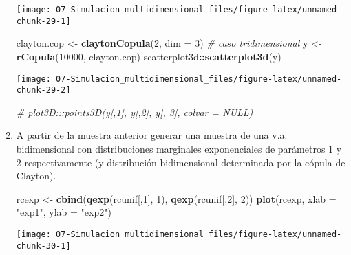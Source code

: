 \documentclass[
]{book}
\newenvironment{Shaded}{\begin{snugshade}}{\end{snugshade}}
\newcommand{\CommentTok}[1]{\textcolor[rgb]{0.56,0.35,0.01}{\textit{#1}}}
\newcommand{\DataTypeTok}[1]{\textcolor[rgb]{0.13,0.29,0.53}{#1}}
\newcommand{\DecValTok}[1]{\textcolor[rgb]{0.00,0.00,0.81}{#1}}
\newcommand{\KeywordTok}[1]{\textcolor[rgb]{0.13,0.29,0.53}{\textbf{#1}}}
\newcommand{\NormalTok}[1]{#1}
\newcommand{\OperatorTok}[1]{\textcolor[rgb]{0.81,0.36,0.00}{\textbf{#1}}}
\newcommand{\StringTok}[1]{\textcolor[rgb]{0.31,0.60,0.02}{#1}}
\theoremstyle{break}
\theoremstyle{definition}
\theoremstyle{definition}
\theoremstyle{definition}
\theoremstyle{remark}
\begin{document}
\begin{enumerate}
  \begin{center}\texttt{[image: 07-Simulacion\_multidimensional\_files/figure-latex/unnamed-chunk-29-1]} \end{center}

\begin{Shaded}
\begin{Highlighting}[]
\NormalTok{clayton.cop <-}\StringTok{ }\KeywordTok{claytonCopula}\NormalTok{(}\DecValTok{2}\NormalTok{, }\DataTypeTok{dim =} \DecValTok{3}\NormalTok{) }\CommentTok{# caso tridimensional}
\NormalTok{y <-}\StringTok{ }\KeywordTok{rCopula}\NormalTok{(}\DecValTok{10000}\NormalTok{, clayton.cop)}
\NormalTok{scatterplot3d}\OperatorTok{::}\KeywordTok{scatterplot3d}\NormalTok{(y)}
\end{Highlighting}
\end{Shaded}

  \begin{center}\texttt{[image: 07-Simulacion\_multidimensional\_files/figure-latex/unnamed-chunk-29-2]} \end{center}

\begin{Shaded}
\begin{Highlighting}[]
\CommentTok{# plot3D:::points3D(y[,1], y[,2], y[, 3], colvar = NULL) }
\end{Highlighting}
\end{Shaded}
\item
  A partir de la muestra anterior generar una muestra de una v.a.
  bidimensional con distribuciones marginales exponenciales de
  parámetros 1 y 2 respectivamente (y distribución bidimensional
  determinada por la cópula de Clayton).

\begin{Shaded}
\begin{Highlighting}[]
\NormalTok{rcexp <-}\StringTok{ }\KeywordTok{cbind}\NormalTok{(}\KeywordTok{qexp}\NormalTok{(rcunif[,}\DecValTok{1}\NormalTok{], }\DecValTok{1}\NormalTok{), }\KeywordTok{qexp}\NormalTok{(rcunif[,}\DecValTok{2}\NormalTok{], }\DecValTok{2}\NormalTok{))}
\KeywordTok{plot}\NormalTok{(rcexp, }\DataTypeTok{xlab =} \StringTok{"exp1"}\NormalTok{, }\DataTypeTok{ylab =} \StringTok{"exp2"}\NormalTok{)}
\end{Highlighting}
\end{Shaded}

  \begin{center}\texttt{[image: 07-Simulacion\_multidimensional\_files/figure-latex/unnamed-chunk-30-1]} \end{center}


\end{enumerate}
\end{document}
